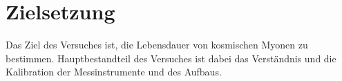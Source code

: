 \section{Zielsetzung}
\label{sec:Zielsetzung}

Das Ziel des Versuches ist, die Lebensdauer von kosmischen Myonen zu bestimmen. Hauptbestandteil des Versuches ist dabei das Verständnis und die Kalibration der Messinstrumente und des Aufbaus.

